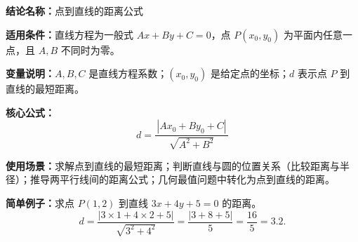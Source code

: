 \textbf{结论名称：}点到直线的距离公式

\textbf{适用条件：}直线方程为一般式 \(Ax+By+C=0\)，点 \(P(x_0,y_0)\) 为平面内任意一点，且 \(A,B\) 不同时为零。

\textbf{变量说明：}\(A,B,C\) 是直线方程系数；\((x_0,y_0)\) 是给定点的坐标；\(d\) 表示点 \(P\) 到直线的最短距离。

\textbf{核心公式：}
\[
\boxed{d = \frac{\,|Ax_0 + By_0 + C|\,}{\sqrt{A^{2} + B^{2}}}}
\]

\textbf{使用场景：}求解点到直线的最短距离；判断直线与圆的位置关系（比较距离与半径）；推导两平行线间的距离公式；几何最值问题中转化为点到直线的距离。

\textbf{简单例子：}求点 \(P(1,2)\) 到直线 \(3x+4y+5=0\) 的距离。
\[
d = \frac{|3\times 1 + 4\times 2 + 5|}{\sqrt{3^{2}+4^{2}}} = \frac{|3+8+5|}{5} = \frac{16}{5} = 3.2.
\]